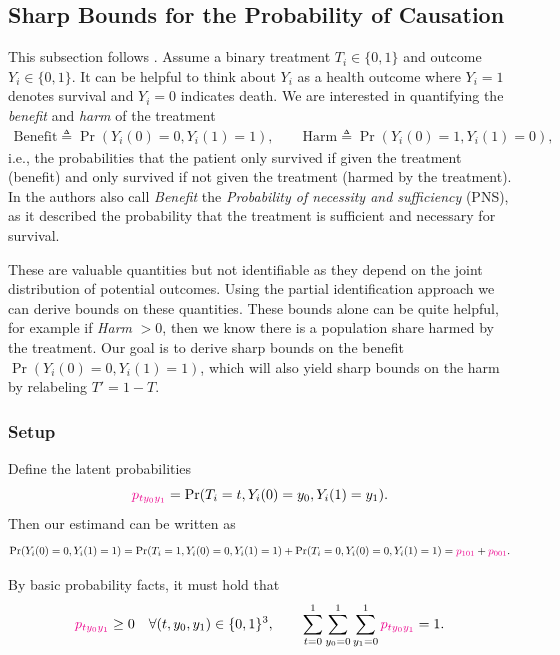 \documentclass[11pt]{exam}
\begin{document}
\subsection{Sharp Bounds for the Probability of Causation}
This subsection follows \citet{tian2000probabilities}.
Assume a binary treatment $T_i \in \{0, 1\}$ and outcome $Y_i \in \{0, 1\}$. It can be helpful to think about $Y_i$ as a health outcome where $Y_i = 1$ denotes survival and $Y_i = 0$ indicates death. We are interested in quantifying the \emph{benefit} and \emph{harm} of the treatment
\begin{align*}
    \text{Benefit}\triangleq \Pr(Y_i(0) = 0, Y_i(1) = 1), \qquad \text{Harm}\triangleq \Pr(Y_i(0) = 1, Y_i(1) = 0),
\end{align*}
i.e., the probabilities that the patient only survived if given the treatment (benefit) and only survived if not given the treatment (harmed by the treatment). In \citet{tian2000probabilities} the authors also call \textit{Benefit} the \emph{Probability of necessity and sufficiency} (PNS), as it described the probability that the treatment is sufficient and necessary for survival.

These are valuable quantities but not identifiable as they depend on the joint distribution of potential outcomes. Using the partial identification approach we can derive bounds on these quantities. These bounds alone can be quite helpful, for example if \textit{Harm} $> 0$, then we know there is a population share harmed by the treatment. Our goal is to derive sharp bounds on the benefit $\Pr(Y_i(0) = 0, Y_i(1) = 1)$, which will also yield sharp bounds on the harm by relabeling $T' = 1 - T$. 

\subsubsection{Setup}
Define the latent probabilities
\[
\textcolor{magenta}{p_{t y_0 y_1}} = \Pr(T_i = t, Y_i(0) = y_0, Y_i(1) = y_1).
\]
\noindent
Then our estimand can be written as
\begin{align*}
    \Pr(Y_i(0) = 0, Y_i(1) = 1) = \Pr(T_i = 1, Y_i(0) = 0, Y_i(1) = 1) + \Pr(T_i = 0, Y_i(0) = 0, Y_i(1) = 1) = \textcolor{magenta}{p_{1 0 1}} + \textcolor{magenta}{p_{0 0 1}}.
\end{align*}

By basic probability facts, it must hold that
\begin{align}\label{eq:pc_prob}
    \textcolor{magenta}{p_{t y_0 y_1}} \geq 0  \quad \forall (t, y_0, y_1) \in \{0, 1\}^3, \qquad \sum_{t=0}^1 \sum_{y_0 = 0}^1 \sum_{y_1 = 0}^1 \textcolor{magenta}{p_{t y_0 y_1}} = 1.
\end{align}
\end{document}
